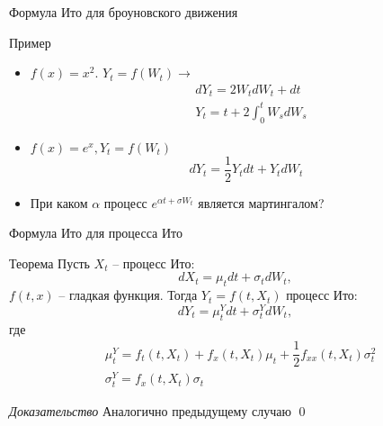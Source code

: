\documentclass{beamer}
\begin{document}
\begin{frame}{Формула Ито для броуновского движения}
     
\end{frame}

\begin{frame}{Пример}

\begin{itemize}
    \item $f(x) =x^2$. $Y_t = f(W_t) \to $
    \begin{align*}
        &dY_t = 2 W_t dW_t + dt  \\
        &Y_t = t + 2 \int_0^t W_s dW_s
    \end{align*}
    \item $f(x) = e^{x}, Y_t = f(W_t)$
    $$
        dY_t = \dfrac{1}{2}Y_t dt + Y_t dW_t
    $$
    \item При каком $\alpha$ процесс $e^{\alpha t + \sigma W_t}$ является мартингалом? 
\end{itemize}
\end{frame}

\begin{frame}{Формула Ито для процесса Ито}
    \begin{block}{Теорема}
    Пусть $X_t$ -- процесс Ито:
    $$
        dX_t = \mu_t dt + \sigma_t dW_t,
    $$ $f(t, x)$ -- гладкая функция. Тогда $Y_t = f(t, X_t)$ процесс Ито:
    $$
        dY_t = \mu^Y_t dt + \sigma^Y_t dW_t,
    $$где 
    \begin{align*}
        &\mu^Y_t = f_t(t, X_t) + f_x(t, X_t) \mu_t + \dfrac{1}{2} f_{xx}(t, X_t) \sigma_t^2 \\
        &\sigma_t^Y = f_x(t, X_t) \sigma_t 
    \end{align*}
     \end{block}
    \textit{Доказательство} Аналогично предыдущему случаю \qed
\end{frame}
\end{document}
